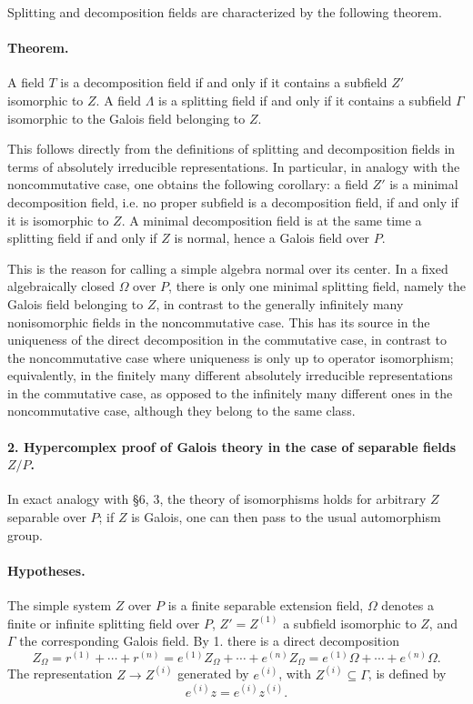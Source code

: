 \documentclass[11pt]{article}
\begin{document}
Splitting and decomposition fields are characterized by the following theorem.

\paragraph{Theorem.}
A field \(T\) is a decomposition field if and only if it contains a subfield \(Z'\) isomorphic to \(Z\). A field \(\Lambda\) is a splitting field if and only if it contains a subfield \(\Gamma\) isomorphic to the Galois field belonging to \(Z\).

This follows directly from the definitions of splitting and decomposition fields in terms of absolutely irreducible representations. In particular, in analogy with the noncommutative case, one obtains the following corollary: a field \(Z'\) is a minimal decomposition field, i.e. no proper subfield is a decomposition field, if and only if it is isomorphic to \(Z\). A minimal decomposition field is at the same time a splitting field if and only if \(Z\) is normal, hence a Galois field over \(P\).

This is the reason for calling a simple algebra normal over its center. In a fixed algebraically closed \(\Omega\) over \(P\), there is only one minimal splitting field, namely the Galois field belonging to \(Z\), in contrast to the generally infinitely many nonisomorphic fields in the noncommutative case. This has its source in the uniqueness of the direct decomposition in the commutative case, in contrast to the noncommutative case where uniqueness is only up to operator isomorphism; equivalently, in the finitely many different absolutely irreducible representations in the commutative case, as opposed to the infinitely many different ones in the noncommutative case, although they belong to the same class.

\paragraph{2. Hypercomplex proof of Galois theory in the case of separable fields \(Z/P\).}
In exact analogy with §6, 3, the theory of isomorphisms holds for arbitrary \(Z\) separable over \(P\); if \(Z\) is Galois, one can then pass to the usual automorphism group.

\paragraph{Hypotheses.}
The simple system \(Z\) over \(P\) is a finite separable extension field, \(\Omega\) denotes a finite or infinite splitting field over \(P\), \(Z'=Z^{(1)}\) a subfield isomorphic to \(Z\), and \(\Gamma\) the corresponding Galois field. By 1. there is a direct decomposition
\[
        Z_\Omega=r^{(1)}+\cdots+r^{(n)}
        =e^{(1)}Z_\Omega+\cdots+e^{(n)}Z_\Omega
        =e^{(1)}\Omega+\cdots+e^{(n)}\Omega .
\]
The representation \(Z\to Z^{(i)}\) generated by \(e^{(i)}\), with \(Z^{(i)}\subseteq\Gamma\), is defined by
\[
        e^{(i)}z=e^{(i)}z^{(i)}.
\]
\end{document}
